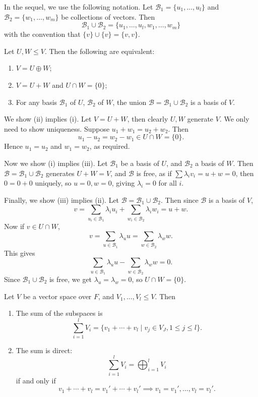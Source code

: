 \documentclass[12pt]{article}
\begin{document}
In the sequel, we use the following notation. Let $\mathcal{B}_1 = \{u_1, \ldots, u_l\}$ and $\mathcal{B}_2 = \{w_1, \ldots, w_m\}$ be collections of vectors. Then
\[
	\mathcal{B}_1 \cup \mathcal{B}_2 = \{u_1, \ldots, u_l, w_1, \ldots, w_m\}
\]
with the convention that $\{v\} \cup \{v\} = \{v, v\}$.

\begin{lemma}
	Let $U, W \leq V$. Then the following are equivalent:
	\begin{enumerate}[\normalfont(i)]
		\item $V = U \oplus W$;
		\item $V = U + W$ and $U \cap W = \{0\}$;
		\item For any basis $\mathcal{B}_1$ of $U$, $\mathcal{B}_2$ of $W$, the union $\mathcal{B} = \mathcal{B}_1 \cup \mathcal{B}_2$ is a basis of $V$.
	\end{enumerate}
\end{lemma}

\begin{proofbox}
	We show (ii) implies (i). Let $V = U + W$, then clearly $U, W$ generate $V$. We only need to show uniqueness. Suppose $u_1 + w_1 = u_2 + w_2$. Then
	\[
		u_1 - u_2 = w_2 - w_1 \in U \cap W = \{0\}
	.\]
	Hence $u_1 = u_2$ and $w_1 = w_2$, as required.

	Now we show (i) implies (iii). Let $\mathcal{B}_1$ be a basis of $U$, and $\mathcal{B}_2$ a basis of $W$. Then $\mathcal{B} = \mathcal{B}_1 \cup \mathcal{B}_2$ generates $U + W = V$, and $\mathcal{B}$ is free, as if $\sum \lambda_i v_i = u + w = 0$, then $0 = 0 + 0$ uniquely, so $u = 0, w = 0$, giving $\lambda_i = 0$ for all $i$.

	Finally, we show (iii) implies (ii). Let $\mathcal{B} = \mathcal{B}_1 \cup \mathcal{B}_2$. Then since $\mathcal{B}$ is a basis of $V$,
	\[
	v = \sum_{u_i \in \mathcal{B}_1}\lambda_i u_i + \sum_{w_i \in \mathcal{B}_2}\lambda_i w_i = u + w
	.\]
	Now if $v \in U \cap W$,
	\[
	v = \sum_{u \in \mathcal{B}_1} \lambda_u u = \sum_{w \in \mathcal{B}_2} \lambda_w w
	.\]
	This gives
	\[
	\sum_{u \in \mathcal{B}_1}\lambda_u u - \sum_{w \in \mathcal{B}_2} \lambda_w w = 0
	.\]
	Since $\mathcal{B}_1 \cup \mathcal{B}_2$ is free, we get $\lambda_u = \lambda_w = 0$, so $U \cap W = \{0\}$.
\end{proofbox}

\begin{definition}
	Let $V$ be a vector space over $F$, and $V_1, \ldots, V_l \leq V$. Then
	\begin{enumerate}[\normalfont(i)]
		\item The sum of the subspaces is
			\[
				\sum_{i = 1}^{l} V_i = \{v_1 + \cdots + v_l \mid v_j \in V_J, 1 \leq j \leq l \}
			.\]
		\item The sum is direct:
			\[
			\sum_{i = 1}^{l} V_i = \bigoplus_{i = 1}^{l} V_i
			\]
			if and only if
			\[
			v_1 + \cdots + v_l = v_1' + \cdots + v_l' \implies v_1 = v_1', \ldots, v_l = v_l'
			.\]
	\end{enumerate}
	
\end{definition}
\end{document}
